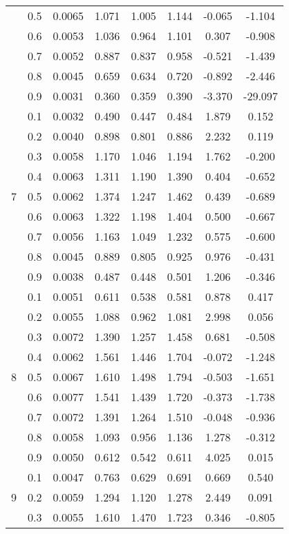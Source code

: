 \documentclass[11pt,a4paper]{report}
\begin{document}
\begin{longtable}{ | c | c || c | c | c | c | c | c | }
 & 0.5 & 0.0065 & 1.071 & 1.005 & 1.144 & -0.065 & -1.104 \\
 & 0.6 & 0.0053 & 1.036 & 0.964 & 1.101 & 0.307 & -0.908 \\
 & 0.7 & 0.0052 & 0.887 & 0.837 & 0.958 & -0.521 & -1.439 \\
 & 0.8 & 0.0045 & 0.659 & 0.634 & 0.720 & -0.892 & -2.446 \\
 & 0.9 & 0.0031 & 0.360 & 0.359 & 0.390 & -3.370 & -29.097 \\
 \hline
\multirow{9}{*}{7} & 0.1 & 0.0032 & 0.490 & 0.447 & 0.484 & 1.879 & 0.152 \\
 & 0.2 & 0.0040 & 0.898 & 0.801 & 0.886 & 2.232 & 0.119 \\
 & 0.3 & 0.0058 & 1.170 & 1.046 & 1.194 & 1.762 & -0.200 \\
 & 0.4 & 0.0063 & 1.311 & 1.190 & 1.390 & 0.404 & -0.652 \\
 & 0.5 & 0.0062 & 1.374 & 1.247 & 1.462 & 0.439 & -0.689 \\
 & 0.6 & 0.0063 & 1.322 & 1.198 & 1.404 & 0.500 & -0.667 \\
 & 0.7 & 0.0056 & 1.163 & 1.049 & 1.232 & 0.575 & -0.600 \\
 & 0.8 & 0.0045 & 0.889 & 0.805 & 0.925 & 0.976 & -0.431 \\
 & 0.9 & 0.0038 & 0.487 & 0.448 & 0.501 & 1.206 & -0.346 \\
 \hline
\multirow{9}{*}{8} & 0.1 & 0.0051 & 0.611 & 0.538 & 0.581 & 0.878 & 0.417 \\
 & 0.2 & 0.0055 & 1.088 & 0.962 & 1.081 & 2.998 & 0.056 \\
 & 0.3 & 0.0072 & 1.390 & 1.257 & 1.458 & 0.681 & -0.508 \\
 & 0.4 & 0.0062 & 1.561 & 1.446 & 1.704 & -0.072 & -1.248 \\
 & 0.5 & 0.0067 & 1.610 & 1.498 & 1.794 & -0.503 & -1.651 \\
 & 0.6 & 0.0077 & 1.541 & 1.439 & 1.720 & -0.373 & -1.738 \\
 & 0.7 & 0.0072 & 1.391 & 1.264 & 1.510 & -0.048 & -0.936 \\
 & 0.8 & 0.0058 & 1.093 & 0.956 & 1.136 & 1.278 & -0.312 \\
 & 0.9 & 0.0050 & 0.612 & 0.542 & 0.611 & 4.025 & 0.015 \\
 \hline
\multirow{9}{*}{9} & 0.1 & 0.0047 & 0.763 & 0.629 & 0.691 & 0.669 & 0.540 \\
 & 0.2 & 0.0059 & 1.294 & 1.120 & 1.278 & 2.449 & 0.091 \\
 & 0.3 & 0.0055 & 1.610 & 1.470 & 1.723 & 0.346 & -0.805 \\

\end{longtable}
\end{document}
